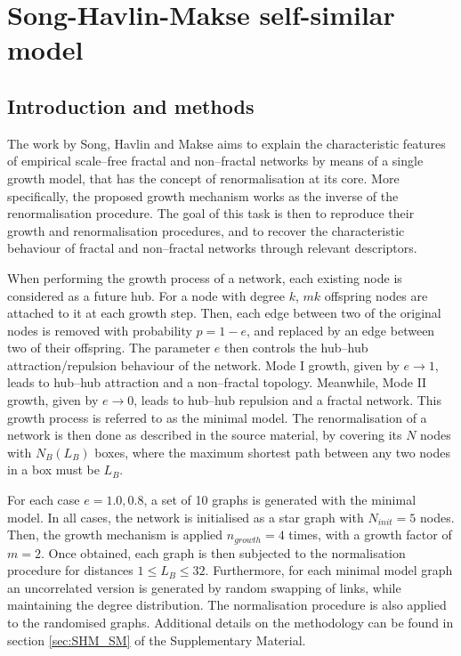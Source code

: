 \chapter{Song-Havlin-Makse self-similar model}


\section{Introduction and methods}
 
The work by Song, Havlin and Makse \cite{song2006origins} aims to explain the characteristic features of empirical scale--free fractal and non--fractal networks by means of a single growth model, that has the concept of renormalisation at its core. More specifically, the proposed growth mechanism works as the inverse of the renormalisation procedure. The goal of this task is then to reproduce their growth and renormalisation procedures, and to recover the characteristic behaviour of fractal and non--fractal networks through relevant descriptors. 

When performing the growth process of a network, each existing node is considered as a future hub. For a node with degree $k$, $mk$ offspring nodes are attached to it at each growth step. Then, each edge between two of the original nodes is removed with probability $p=1-e$, and replaced by an edge between two of their offspring. The parameter $e$ then controls the hub--hub attraction/repulsion behaviour of the network. Mode I growth, given by $e\rightarrow1$, leads to hub--hub attraction and a non--fractal topology. Meanwhile, Mode II growth, given by $e\rightarrow0$, leads to hub--hub repulsion and a fractal network. This growth process is referred to as the minimal model. The renormalisation of a network is then done as described in the source material, by covering its $N$ nodes with $N_B(L_B)$ boxes, where the maximum shortest path between any two nodes in a box must be $L_B$.

For each case $e=1.0, 0.8$, a set of 10 graphs is generated with the minimal model. In all cases, the network is initialised as a star graph with $N_{init}=5$ nodes. Then, the growth mechanism is applied $n_{growth}=4$ times, with a growth factor of $m=2$. Once obtained, each graph is then subjected to the normalisation procedure for distances $1\leq L_B\leq32$. Furthermore, for each minimal model graph an uncorrelated version is generated by random swapping of links, while maintaining the degree distribution. The normalisation procedure is also applied to the randomised graphs. Additional details on the methodology can be found in section \ref{sec:SHM_SM} of the Supplementary Material.



